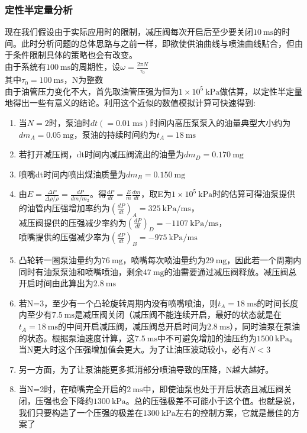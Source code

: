 \documentclass{article}
\newcommand{\prb}{\times 10^5~\mathrm{kPa}}
\newcommand{\pre}{~\mathrm{kPa}}
\newcommand{\tim}{~\mathrm{ms}}
\newcommand{\mas}{~\mathrm{mg}}
\begin{document}
	\subsubsection{定性半定量分析}
		现在我们假设由于实际应用时的限制，减压阀每次开启后至少要关闭$10\tim$的时间。此时分析问题的总体思路与之前一样，即欲使供油曲线与喷油曲线贴合，但由于条件限制具体的策略也会有改变。\\
		由于系统有$100\tim$的周期性，设$\omega=\frac{2\pi{}N}{\tau_0}$\\
		其中$\tau_0=100\tim$，N为整数\\
		
		由于油管压力变化不大，首先取油管压强为恒为$1\prb$做估算，以定性半定量地得出一些有意义的结论。利用这个近似的数值模拟计算可快速得到:
		\begin{enumerate}
			\item
			当$N=2$时，泵油时$dt(=0.01\tim)$时间内高压泵泵入的油量典型大小约为$dm_A=0.05\mas$，泵油的持续时间约为$t_A=18\tim$
			\item
			若打开减压阀，dt时间内减压阀流出的油量为$dm_D=0.170\mas$
			\item 
			喷嘴dt时间内喷出煤油质量为$dm_B=0.150\mas$
			\item 
			由$E=\frac{\Delta{P}}{\Delta{\rho}/\rho}=\frac{dP}{dm/m_2}$。得$\frac{dP}{dt}=\frac{E}{m}\frac{dm}{dt}$，取E为$1\prb$时的估算可得油泵提供的油管内压强增加率约为$(\frac{dP}{dt})_A=325~\mathrm{kPa/ms}$，\\减压阀提供的压强减少率约为$(\frac{dP}{dt})_D=-1107~\mathrm{kPa/ms}$，\\喷嘴提供的压强减少率为$(\frac{dP}{dt})_B=-975~\mathrm{kPa/ms}$
			\item 
			凸轮转一圈泵油量约为$76\mas$，喷嘴每次喷油量约为$29\mas$，因此若一个周期内同时有油泵泵油和喷嘴喷油，剩余$47\mas$的油需要通过减压阀释放。减压阀总开启时间由此算出为$2.8\tim$
			\item 
			若N=3，至少有一个凸轮旋转周期内没有喷嘴喷油，则$t_A=18\tim$的时间长度内至少有$7.5\tim$是减压阀关闭（减压阀不能连续开启，最好的状态就是在$t_A=18\tim$的中间开启减压阀，减压阀总开启时间为$2.8\tim$），同时油泵在泵油的状态。根据泵油速度计算，这$7.5\tim$中不可避免增加的油压约为$1500\pre$。当N更大时这个压强增加值会更大。为了让油压波动较小，必有$N<3$
			\item 
			另一方面，为了让泵油能更多抵消部分喷油导致的压降，N越大越好。
			\item
			当N=2时，在喷嘴完全开启的$2\tim$中，即使油泵也处于开启状态且减压阀关闭，压强也会下降约$1300\pre$。总的压强极差不可能小于这个值。也就是说，我们只要构造了一个压强的极差在$1300\pre$左右的控制方案，它就是最佳的方案了
		\end{enumerate}
\end{document}
